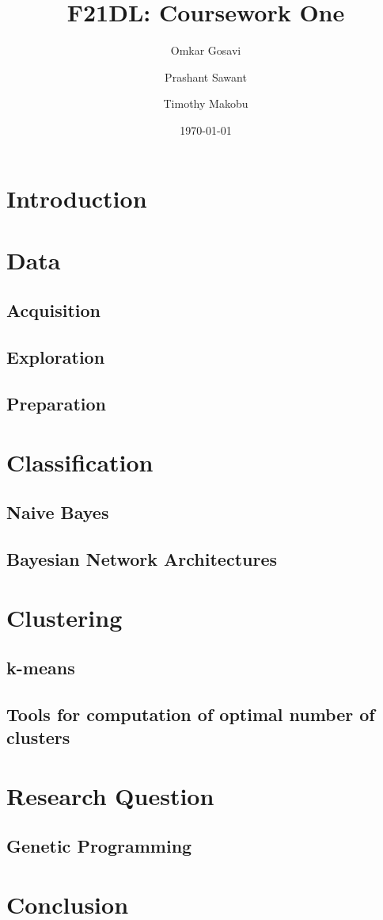 \documentclass[12pt]{report}
\title{F21DL: Coursework One}
\author{
	Omkar Gosavi
	\and
	Prashant Sawant
	\and
	Timothy Makobu
}
\date{\today}
\begin{document}
\maketitle

\tableofcontents

\section{Introduction}


\section{Data}
\subsection{Acquisition}
\subsection{Exploration}
\subsection{Preparation}

\section{Classification}
\subsection{Naive Bayes}
\subsection{Bayesian Network Architectures}

\section{Clustering}
\subsection{k-means}
\subsection{Tools for computation of optimal number of clusters}

\section{Research Question}
\subsection{Genetic Programming}

\section{Conclusion}
\end{document}
